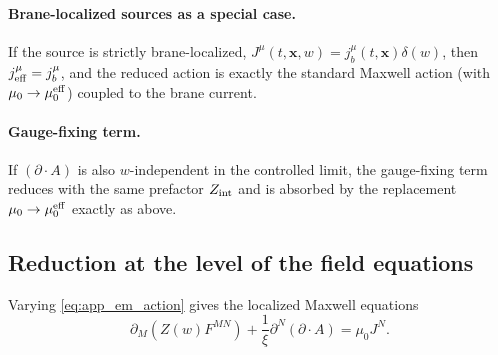 \documentclass[11pt]{article}
\begin{document}
\paragraph{Brane-localized sources as a special case.}
If the source is strictly brane-localized, \(J^\mu(t,\mathbf{x},w)=j_b^\mu(t,\mathbf{x})\delta(w)\),
then \(j_{\rm eff}^\mu=j_b^\mu\), and the reduced action is exactly the standard Maxwell action
(with \(\mu_0\to\mu_0^{\rm eff}\)) coupled to the brane current.

\paragraph{Gauge-fixing term.}
If \((\partial\!\cdot\!A)\) is also \(w\)-independent in the controlled limit, the gauge-fixing term
reduces with the same prefactor \(Z_{\rm int}\) and is absorbed by the replacement
\(\mu_0\to\mu_0^{\rm eff}\) exactly as above.

\subsection{Reduction at the level of the field equations}
\label{app:eom_reduction}

Varying \eqref{eq:app_em_action} gives the localized Maxwell equations
\begin{equation}
\partial_M\!\left(Z(w)F^{MN}\right) + \frac{1}{\xi}\partial^N(\partial\!\cdot\!A)
=
\mu_0 J^N.
\label{eq:app_localized_maxwell}
\end{equation}
\end{document}
